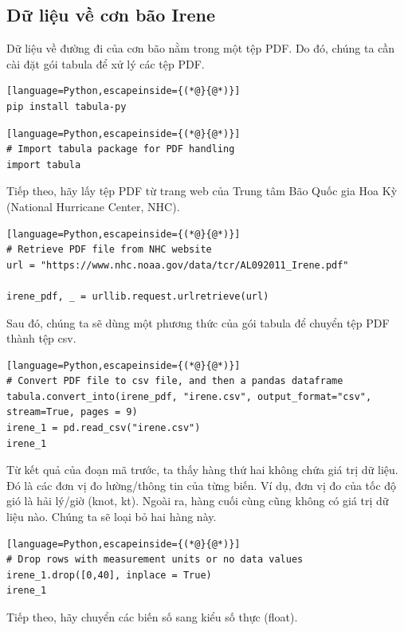 \subsection{Dữ liệu về cơn bão Irene}

Dữ liệu về đường đi của cơn bão nằm trong một tệp PDF. Do đó, chúng ta cần cài đặt gói tabula để xử lý các tệp PDF.

\begin{lstlisting}[language=Python,escapeinside={(*@}{@*)}]
pip install tabula-py
\end{lstlisting}

\begin{lstlisting}[language=Python,escapeinside={(*@}{@*)}]
# Import tabula package for PDF handling
import tabula
\end{lstlisting}

Tiếp theo, hãy lấy tệp PDF từ trang web của Trung tâm Bão Quốc gia Hoa Kỳ (National Hurricane Center, NHC).

\begin{lstlisting}[language=Python,escapeinside={(*@}{@*)}]
# Retrieve PDF file from NHC website
url = "https://www.nhc.noaa.gov/data/tcr/AL092011_Irene.pdf"

irene_pdf, _ = urllib.request.urlretrieve(url)
\end{lstlisting}

Sau đó, chúng ta sẽ dùng một phương thức của gói tabula để chuyển tệp PDF thành tệp csv.

\begin{lstlisting}[language=Python,escapeinside={(*@}{@*)}]
# Convert PDF file to csv file, and then a pandas dataframe
tabula.convert_into(irene_pdf, "irene.csv", output_format="csv", stream=True, pages = 9)
irene_1 = pd.read_csv("irene.csv")
irene_1
\end{lstlisting}

Từ kết quả của đoạn mã trước, ta thấy hàng thứ hai không chứa giá trị dữ liệu. Đó là các đơn vị đo lường/thông tin của từng biến. Ví dụ, đơn vị đo của tốc độ gió là hải lý/giờ (knot, kt). Ngoài ra, hàng cuối cùng cũng không có giá trị dữ liệu nào. Chúng ta sẽ loại bỏ hai hàng này.

\begin{lstlisting}[language=Python,escapeinside={(*@}{@*)}]
# Drop rows with measurement units or no data values
irene_1.drop([0,40], inplace = True)
irene_1
\end{lstlisting}

Tiếp theo, hãy chuyển các biến số sang kiểu số thực (float).

